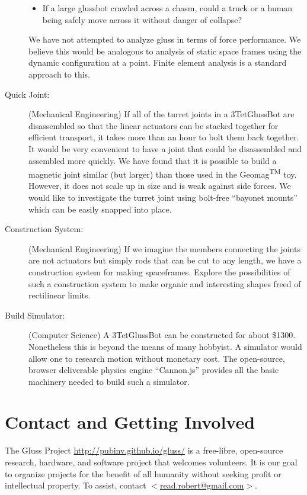 \documentclass[11pt]{article}
\begin{document}
\begin{description}
\begin{itemize}
\item If a large glussbot crawled across a chasm, could a truck or a human being safely move
  across it without danger of collapse?
\end{itemize}
We have not attempted to analyze gluss in terms of force performance. We believe this would
be analogous to analysis of static space frames using the dynamic configuration at a point.
Finite element analysis is a standard approach to this.
\item [Quick Joint:] (Mechanical Engineering) If all of the turret joints in a 3TetGlussBot are disassembled so that
  the linear actuators can be stacked together for efficient transport, it takes more than an hour
  to bolt them back together. It would be very convenient to have a joint that could be
  disassembled and assembled more quickly. We have found that it is possible to build a magnetic
  joint similar (but larger) than those used in the Geomag\textsuperscript{TM} toy. However, it does not scale up in size
  and is weak against side forces. We would like to investigate the turret joint using bolt-free ``bayonet mounts'' which
  can be easily snapped into place.
\item [Construction System:] (Mechanical Engineering) If we imagine the members connecting the joints are not actuators but
  simply rods that can be cut to any length, we have a construction system for making spaceframes.
  Explore the possibilities of such a construction system to make organic and interesting shapes
  freed of rectilinear limits.
\item [Build Simulator:] (Computer Science) A 3TetGlussBot can be constructed for about \$1300. Nonetheless this
  is beyond the means of many hobbyist. A simulator would allow one to research 
  motion without monetary cost. The open-source, browser deliverable physics engine ``Cannon.js''
  provides all the basic machinery needed to build such a simulator.
\end{description}


\section{Contact and Getting Involved}

The Gluss Project \href{http://pubinv.github.io/gluss/}{http://pubinv.github.io/gluss/}
is a free-libre, open-source research, hardware, and software project that welcomes volunteers.
It is our goal to organize projects for the benefit of all humanity without seeking profit or intellectual property.
To assist, contact \href{mailto:read.robert@gmail.com}{$<$read.robert@gmail.com$>$}.
\end{document}
